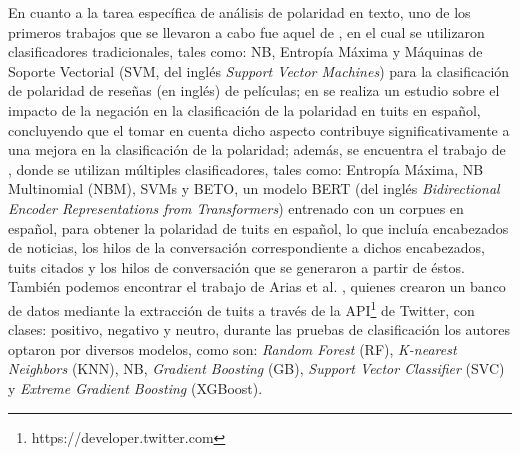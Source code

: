 \documentclass[a4paper]{llncs}
\begin{document}
En cuanto a la tarea específica de análisis de polaridad en texto, uno de los
primeros trabajos que se llevaron a cabo fue aquel de
\cite{pang_sentiment_classification}, en el cual se utilizaron clasificadores
tradicionales, tales como: NB, Entropía Máxima y Máquinas de Soporte
Vectorial (SVM, del inglés \emph{Support Vector Machines}) para la clasificación de
polaridad de reseñas (en inglés) de películas; en \cite{scope_of_negation_camara}
se realiza un estudio sobre el impacto de la negación en la clasificación de la
polaridad en tuits en español, concluyendo que el tomar en cuenta dicho aspecto
contribuye significativamente a una mejora en la clasificación de la polaridad;
además, se encuentra el trabajo de \cite{paper_cesar}, donde se utilizan múltiples
clasificadores, tales como: Entropía Máxima, NB Multinomial (NBM), SVMs y
BETO, un modelo BERT (del inglés \emph{Bidirectional Encoder Representations from
Transformers}) entrenado con un corpues en español, para obtener la polaridad
de tuits en español, lo que incluía encabezados de noticias, los hilos de la
conversación correspondiente a dichos encabezados, tuits citados y los hilos de
conversación que se generaron a partir de éstos. También podemos encontrar el
trabajo de Arias et al. \cite{arias_analyzing_spanish}, quienes crearon un banco
de datos mediante la extracción de tuits a través de la
API\footnote{https://developer.twitter.com} de Twitter, con clases: positivo,
negativo y neutro, durante las pruebas de clasificación los autores optaron por
diversos modelos, como son: \emph{Random Forest} (RF), \emph{K-nearest Neighbors} (KNN),
NB, \emph{Gradient Boosting} (GB), \emph{Support Vector Classifier} (SVC) y
\emph{Extreme Gradient Boosting} (XGBoost).
\end{document}
